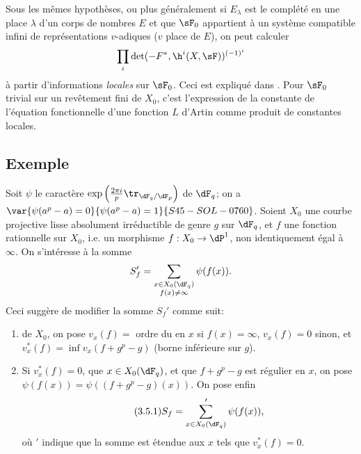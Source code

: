 Sous les mêmes hypothèses, ou plus généralement si $E_\lambda$ est le 
complété en une place $\lambda$ d'un corps de nombres $E$ et que $\sF_0$ 
appartient à un système compatible infini de représentations $v$-adiques 
($v$ place de $E$), on peut calculer 
\[
  \prod_i \det(-F^\ast,\h^i(X,\sF))^{(-1)^i} 
\]
à partir d'informations \emph{locales} sur $\sF_0$. Ceci est expliqué dans 
\cite{de73}. Pour $\sF_0$ trivial sur un revêtement fini de $X_0$, c'est 
l'expression de la constante de l'équation fonctionnelle d'une fonction $L$ 
d'Artin comme produit de constantes locales. 





\subsection{Exemple}\label{VI:3-5}

Soit $\psi$ le caractère 
$\exp\left(\frac{2\pi i}{p} \tr_{\dF_q/\dF_p}\right)$ de $\dF_q$; on a 
$\var{\psi(a^p-a)=0}{\psi(a^p-a)=1}{S45-SOL-0760}$. Soient $X_0$ une courbe projective lisse absolument 
irréductible de genre $g$ sur $\dF_q$, et $f$ une fonction rationnelle sur 
$X_0$, i.e. un morphisme $f:X_0 \to \dP^1$, non identiquement égal à 
$\infty$. On s'intéresse à la somme 
\[
  S_f' = \sum_{\substack{x\in X_0(\dF_q) \\ f(x)\ne \infty}} \psi(f(x)) 
  \text{.}
\]
 Ceci suggère de 
modifier la somme $S_f'$ comme suit: 
\begin{enumerate}[\indent a)]
  \item {} de $X_0$, on pose $v_x(f) = $ ordre du 
     en $x$ si $f(x)=\infty$, $v_x(f)=0$ sinon, et 
    $v_x^\ast(f) = \inf v_x(f+g^p-g)$ (borne inférieure sur $g$). 
  \item Si $v_x^\ast(f)=0$, que $x\in X_0(\dF_q)$, et que $f+g^p-g$ est 
    régulier en $x$, on pose $\psi(f(x)) = \psi((f+g^p-g)(x))$. On pose enfin 
\begin{equation*}\tag{3.5.1}\label{VI:eq:3-5-1}
      S_f = \sum'_{x\in X_0(\dF_q)} \psi(f(x)) \text{,}
    \end{equation*}
    où $\prime$ indique que la somme est étendue aux $x$ tels que 
    $v_x^\ast(f)=0$. 
\end{enumerate}

